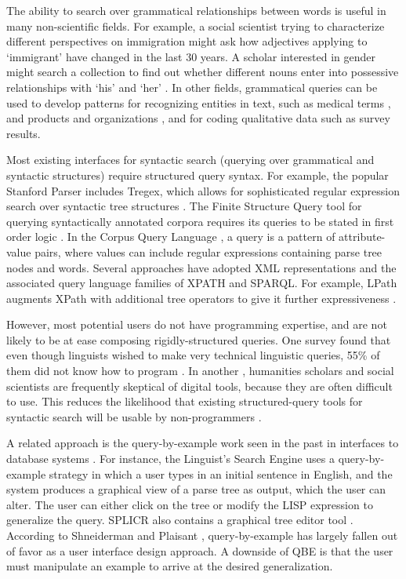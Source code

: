 The ability to search over grammatical relationships between words is useful in many non-scientific fields. For example, a social scientist trying to characterize different perspectives on immigration might ask how adjectives applying to `immigrant' have changed in the last 30 years. A scholar interested in gender might search a collection to find out whether different nouns enter into possessive relationships with `his' and `her' \cite{muralidharan2013supporting}. In other fields, grammatical queries can be used to develop patterns for recognizing entities in text, such as medical terms \cite{hirschman2005overview,maclean2013identifying}, and  products and organizations \cite{culotta2005reducing}, and for coding qualitative data such as survey results.

Most existing interfaces for syntactic search (querying over grammatical and syntactic structures) require structured query syntax. For example, the popular Stanford Parser includes Tregex, which allows for sophisticated regular expression search over syntactic tree structures \cite{levy2006tregex}.
The Finite Structure Query tool for querying syntactically annotated corpora requires its queries to be stated in first order logic \cite{kepser2003finite}. In the Corpus Query Language \cite{jakubicek2010fast}, a query is a pattern of attribute-value pairs, where values can include regular expressions containing parse tree nodes and words.
Several approaches have adopted XML representations and the associated query language families of XPATH and SPARQL. For example, LPath augments XPath with additional tree operators to give it further expressiveness \cite{lai2010querying}.

However, most potential users do not have programming expertise, and are not likely to be at ease composing rigidly-structured queries. One survey found that even though linguists wished to make very technical  linguistic queries, 55\% of them did not know how to program \cite{soehn2008requirements}. In another \cite{gibbs_building_2012}, humanities scholars and social scientists are frequently skeptical of digital tools, because they are often difficult to use. This reduces the likelihood that existing structured-query tools for syntactic search will be usable by non-programmers \cite{ogden1983query}.

A related approach is the query-by-example work seen in the past in interfaces to database systems \cite{androutsopoulos1995natural}. For instance, the Linguist's Search Engine \cite{resnik2005web} uses a query-by-example strategy in which a user types in an initial sentence in English, and the system produces a graphical view of a parse tree as output, which the user can alter. 
The user can either click on the tree or modify the LISP expression to generalize the query. SPLICR also contains a graphical tree editor tool \cite{rehm2009sustainability}. 
According to Shneiderman and Plaisant \cite{shneiderman2010designing}, query-by-example has largely fallen out of favor as a user interface design approach. A downside of QBE is that the user must manipulate an example to arrive at the desired generalization.


